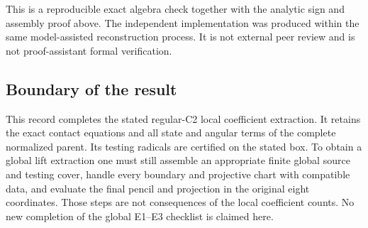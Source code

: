 This is a reproducible exact algebra check together with the analytic sign
and assembly proof above. The independent implementation was produced within
the same model-assisted reconstruction process. It is not external peer
review and is not proof-assistant formal verification.

\subsection{Boundary of the result}

This record completes the stated regular-C2 local coefficient extraction. It
retains the exact contact equations and all state and angular terms of the
complete normalized parent. Its testing radicals are certified on the stated
box. To obtain a global lift extraction one must still assemble an appropriate
finite global source and testing cover, handle every boundary and projective
chart with compatible data, and evaluate the final pencil and projection in
the original eight coordinates. Those steps are not consequences of the
local coefficient counts. No new completion of the global E1--E3 checklist
is claimed here.
